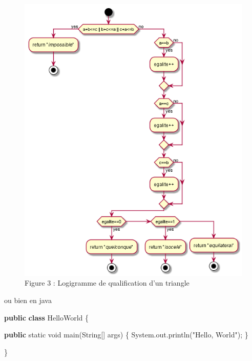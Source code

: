 \documentclass[
  10pt,
]{book}
\newenvironment{Shaded}{}{}
\newcommand{\BuiltInTok}[1]{#1}
\newcommand{\DataTypeTok}[1]{\textcolor[rgb]{0.56,0.13,0.00}{#1}}
\newcommand{\FunctionTok}[1]{\textcolor[rgb]{0.02,0.16,0.49}{#1}}
\newcommand{\KeywordTok}[1]{\textcolor[rgb]{0.00,0.44,0.13}{\textbf{#1}}}
\newcommand{\NormalTok}[1]{#1}
\newcommand{\StringTok}[1]{\textcolor[rgb]{0.25,0.44,0.63}{#1}}
\begin{document}
\begin{figure}
\centering
\includegraphics{./tex2pdf.-1f50f5654d7493c4/236c15226c43ff9726a0f782e89309124a2f03cb.png}
\caption{Figure 3 : Logigramme de qualification d'un triangle}
\end{figure}

ou bien en java

\begin{Shaded}
\begin{Highlighting}[]
\KeywordTok{public} \KeywordTok{class}\NormalTok{ HelloWorld \{}

    \KeywordTok{public} \DataTypeTok{static} \DataTypeTok{void} \FunctionTok{main}\NormalTok{(}\BuiltInTok{String}\NormalTok{[] args) \{}
        \BuiltInTok{System}\NormalTok{.}\FunctionTok{out}\NormalTok{.}\FunctionTok{println}\NormalTok{(}\StringTok{"Hello, World"}\NormalTok{);}
\NormalTok{    \}}

\NormalTok{\}}
\end{Highlighting}
\end{Shaded}
\end{document}
